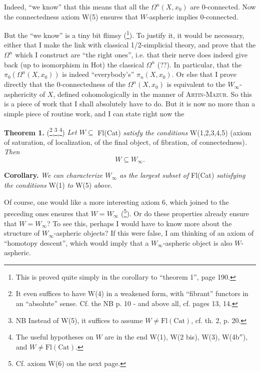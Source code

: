 Indeed, ``we know'' that this means that all the $\Omega^n(X, x_0)$ are 0-connected. Now the connectedness axiom W(5) ensures that $W$-aspheric implies 0-connected.

But the ``we know'' is a tiny bit flimsy (\footnote[25]{This is proved quite simply in the corollary to ``theorem 1'', page 190.}). To justify it, it would be necessary, either %
that I make the link with classical 1/2-simplicial theory, and prove that the $\Omega^n$ which I construct are ``the right ones'', i.e. that their nerve does indeed give back (up to isomorphism in Hot) the classical $\Omega^n$ (??). In particular, that the $\pi_0(\Omega^n(X, x_0))$ is indeed ``everybody's'' $\pi_n(X, x_0)$. Or else that I prove directly that the 0-connectedness of the $\Omega^n(X, x_0)$ is equivalent to the $W_\infty$-asphericity of $X$, defined cohomologically in the manner of \textsc{Artin-Mazur}. So this is a piece of work that I shall absolutely have to do. But it is now no more than a simple piece of routine work, and I can state right now the

\textbf{Theorem 1.} (\footnote[26]{It even suffices to have W(4) in a weakened form, with ``fibrant'' functors in an ``absolute'' sense. Cf. the NB p. 10 - and above all, cf. pages 13, 14.},\footnote[27]{NB Instead of W(5), it suffices to assume $W \neq \mathrm{Fl}(\mathrm{Cat})$, cf. th. 2, p. 20.},\footnote[28]{The useful hypotheses on $W$ are in the end W(1), W(2 bis), W(3), W(4b$''$), and $W \neq \mathrm{Fl}(\mathrm{Cat})$.}) \textit{Let $W \subseteq$} Fl(Cat) \textit{satisfy the conditions} W(1,2,3,4,5) (axiom of saturation, of localization, of the final object, of fibration, of connectedness)\textit{. Then}
\[ W \subseteq W_\infty . \]

\textbf{Corollary.} \textit{We can characterize $W_\infty$ as the largest subset of} Fl(Cat) \textit{satisfying the}
\textit{conditions} W(1) \textit{to} W(5) \textit{above.}

Of course, one would like a more interesting axiom 6, which joined to the preceding ones ensures that $W = W_\infty$ (\footnote[29]{Cf. axiom W(6) on the next page.}). Or do these properties already ensure that $W = W_\infty$? To see this, perhaps I would have to know more about the structure of $W_\infty$-aspheric objects? If this were false, I am thinking of an axiom of ``homotopy descent'', which would imply that a $W_\infty$-aspheric object is also $W$-aspheric.


